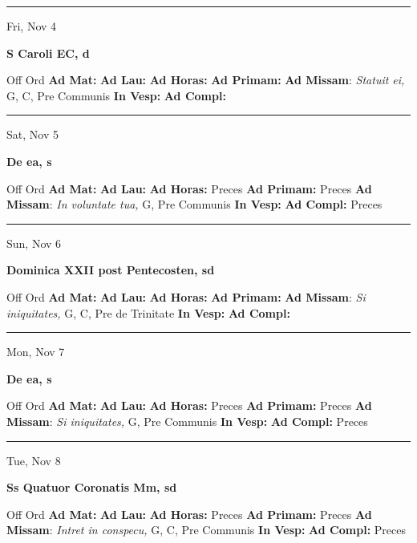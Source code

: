 \documentclass[letterpaper, 10pt]{article}
\begin{document}
\hrule
\begin{center}
Fri, Nov 4
\end{center}\textbf{ \large S Caroli EC, \textnormal{\normalsize d}}
\begin{justify}
Off Ord
\textbf{Ad Mat: }
\textbf{Ad Lau: }
\textbf{Ad Horas: }
\textbf{Ad Primam: }
\textbf{Ad Missam}: \textit{Statuit ei,} G, C, Pre Communis
\textbf{In Vesp: }
\textbf{Ad Compl: }\end{justify}



\hrule
\begin{center}
Sat, Nov 5
\end{center}\textbf{ \large De ea, \textnormal{\normalsize s}}
\begin{justify}
Off Ord
\textbf{Ad Mat: }
\textbf{Ad Lau: }
\textbf{Ad Horas: }Preces
\textbf{Ad Primam: }Preces
\textbf{Ad Missam}: \textit{In voluntate tua,} G, Pre Communis
\textbf{In Vesp: }
\textbf{Ad Compl: }Preces\end{justify}



\hrule
\begin{center}
Sun, Nov 6
\end{center}\textbf{ \large Dominica XXII post Pentecosten, \textnormal{\normalsize sd}}
\begin{justify}
Off Ord
\textbf{Ad Mat: }
\textbf{Ad Lau: }
\textbf{Ad Horas: }
\textbf{Ad Primam: }
\textbf{Ad Missam}: \textit{Si iniquitates,} G, C, Pre de Trinitate
\textbf{In Vesp: }
\textbf{Ad Compl: }\end{justify}



\hrule
\begin{center}
Mon, Nov 7
\end{center}\textbf{ \large De ea, \textnormal{\normalsize s}}
\begin{justify}
Off Ord
\textbf{Ad Mat: }
\textbf{Ad Lau: }
\textbf{Ad Horas: }Preces
\textbf{Ad Primam: }Preces
\textbf{Ad Missam}: \textit{Si iniquitates,} G, Pre Communis
\textbf{In Vesp: }
\textbf{Ad Compl: }Preces\end{justify}



\hrule
\begin{center}
Tue, Nov 8
\end{center}\textbf{ \large Ss Quatuor Coronatis Mm, \textnormal{\normalsize sd}}
\begin{justify}
Off Ord
\textbf{Ad Mat: }
\textbf{Ad Lau: }
\textbf{Ad Horas: }Preces
\textbf{Ad Primam: }Preces
\textbf{Ad Missam}: \textit{Intret in conspecu,} G, C, Pre Communis
\textbf{In Vesp: }
\textbf{Ad Compl: }Preces\end{justify}
\end{document}
